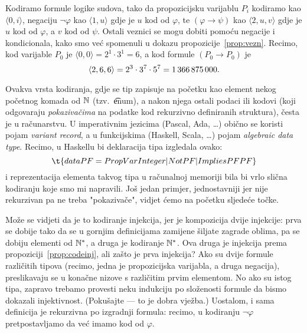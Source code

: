 \begin{primjer}\label{pr:lskod}
Kodiramo formule logike sudova, tako da propozicijsku varijablu $P_i$ kodiramo kao $\langle0,i\rangle$, negaciju $\lnot\varphi$ kao $\langle1,u\rangle$ gdje je $u$ kod od $\varphi$, te $(\varphi\to\psi)$ kao $\langle2,u,v\rangle$ gdje je $u$ kod od $\varphi$, a $v$ kod od $\psi$. Ostali veznici se mogu dobiti pomoću negacije i kondicionala, kako smo već spomenuli u dokazu propozicije~\ref{prop:vezn}. Recimo, kod varijable $P_0$ je $\langle0,0\rangle=2^1\cdot3^1=6$, a kod formule $(P_0\to P_0)$ je \begin{equation}
    \langle2,6,6\rangle=2^3\cdot3^7\cdot5^7=1\,366\,875\,000\text.
\end{equation}

Ovakva vrsta kodiranja, gdje se tip zapisuje na početku kao element nekog početnog komada od ${\mathbb N}$ (tzv.\ \t{enum}), a nakon njega ostali podaci ili kodovi (koji odgovaraju \emph{pokazivačima} na podatke kod rekurzivno definiranih struktura), česta je u računarstvu. U imperativnim jezicima (Pascal, Ada, \ldots) obično se koristi pojam \emph{variant record}, a u funkcijskima (Haskell, Scala, \ldots) pojam \emph{algebraic data type}. Recimo, u Haskellu bi deklaracija tipa izgledala ovako:
\begin{equation}
\t{data PF = PropVar Integer | Not PF | Implies PF PF}
\end{equation}
i reprezentacija elementa takvog tipa u računalnoj memoriji bila bi vrlo slična kodiranju koje smo mi napravili. Još jedan primjer, jednostavniji jer nije rekurzivan pa ne treba "pokazivače", vidjet ćemo na početku sljedeće točke.

Može se vidjeti da je to kodiranje injekcija, jer je kompozicija dvije injekcije: prva se dobije tako da se u gornjim definicijama zamijene šiljate zagrade oblima, pa se dobiju elementi od ${\mathbb N}^*$, a druga je kodiranje ${\mathbb N}^*$. Ova druga je injekcija prema propoziciji~\ref{prop:codeinj}, ali zašto je prva injekcija? Ako su dvije formule različitih tipova (recimo, jedna je propozicijska varijabla, a druga negacija), preslikavaju se u konačne nizove s različitim prvim elementom. No ako su istog tipa, zapravo trebamo provesti neku indukciju po složenosti formule da bismo dokazali injektivnost. (Pokušajte --- to je dobra vježba.) Uostalom, i sama definicija je rekurzivna po izgradnji formula: recimo, u kodiranju $\lnot\varphi$ pretpostavljamo da već imamo kod od $\varphi$.


\end{primjer}
